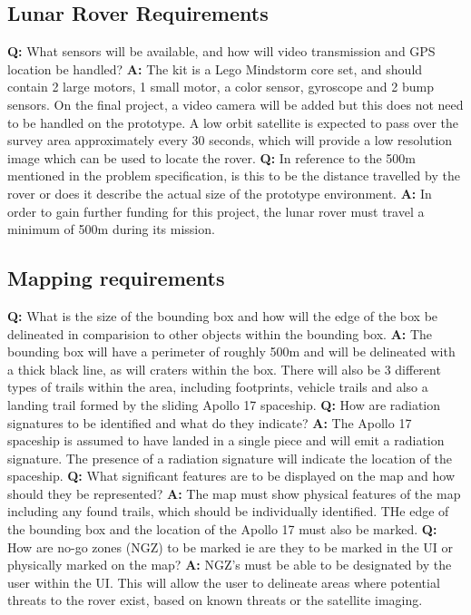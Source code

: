 \documentclass{article}
\begin{document}
    \subsection{Lunar Rover Requirements}
    	\textbf{Q:} What sensors will be available, and how will video transmission and GPS location be handled? \newline
        \textbf{A:} The kit is a Lego Mindstorm core set, and should contain 2 large motors, 1 small motor, a color sensor, gyroscope and 2 bump sensors. On the final project, a video camera will be added but this does not need to be handled on the prototype. A low orbit satellite is expected to pass over the survey area approximately every 30 seconds, which will provide a low resolution image which can be used to locate the rover.\newline
        \textbf{Q:} In reference to the 500m mentioned in the problem specification, is this to be the distance travelled by the rover or does it describe the actual size of the prototype environment. \newline
        \textbf{A:} In order to gain further funding for this project, the lunar rover must travel a minimum of 500m during its mission. 
        
    \subsection{Mapping requirements}
    	\textbf{Q:} What is the size of the bounding box and how will the edge of the box be delineated in comparision to other objects within the bounding box. \newline
        \textbf{A:} The bounding box will have a perimeter of roughly 500m and will be delineated with a thick black line, as will craters within the box. There will also be 3 different types of trails within the area, including footprints, vehicle trails and also a landing trail formed by the sliding Apollo 17 spaceship. \newline
        \textbf{Q:} How are radiation signatures to be identified and what do they indicate? \newline
        \textbf{A:} The Apollo 17 spaceship is assumed to have landed in a single piece and will emit a radiation signature. The presence of a radiation signature will indicate the location of the spaceship. \newline
        \textbf{Q:} What significant features are to be displayed on the map and how should they be represented? \newline
        \textbf{A:} The map must show physical features of the map including any found trails, which should be individually identified. THe edge of the bounding box and the location of the Apollo 17 must also be marked. \newline
        \textbf{Q:} How are no-go zones (NGZ) to be marked ie are they to be marked in the UI or physically marked on the map?\newline
        \textbf{A:} NGZ's must be able to be designated by the user within the UI. This will allow the user to delineate areas where potential threats to the rover exist, based on known threats or the satellite imaging. \newline
        
\end{document}
